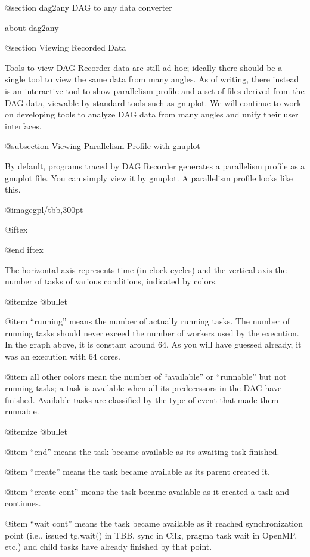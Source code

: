 @section dag2any DAG to any data converter

about dag2any

@section Viewing Recorded Data

Tools to view DAG Recorder data are still ad-hoc; ideally there should
be a single tool to view the same data from many angles.  As of writing,
there instead is an interactive tool to show parallelism profile and a
set of files derived from the DAG data, viewable by standard tools such as
gnuplot.  We will continue to work on developing tools to analyze DAG
data from many angles and unify their user interfaces.

@subsection Viewing Parallelism Profile with gnuplot 

By default, programs traced by DAG Recorder generates a parallelism profile as a gnuplot file.  You can simply view it by gnuplot.  A parallelism profile looks like this.

@image{gpl/tbb,300pt}

@iftex


@end iftex

The horizontal axis represents time (in clock cycles) and the vertical
axis the number of tasks of various conditions, indicated by colors.

@itemize @bullet

@item ``running'' means the number of actually running tasks.
The number of running tasks should never exceed the number of workers used
by the execution.  In the graph above, it is constant around 64.  As you
will have guessed already, it was an execution with 64 cores.

@item all other colors mean the number of ``available'' or 
``runnable'' but not running tasks; a task is available when all its
predecessors in the DAG have finished.  Available tasks are classified
by the type of event that made them runnable.  

@itemize @bullet

@item ``end'' means the task became available as its awaiting task finished.

@item ``create'' means the task became available as its parent created it.

@item ``create cont'' means the task became available as it created a task and continues.

@item ``wait cont'' means the task became available as it reached synchronization point (i.e., issued tg.wait() in TBB, sync in Cilk, pragma task wait in OpenMP, etc.) and child tasks have already finished by that point.

